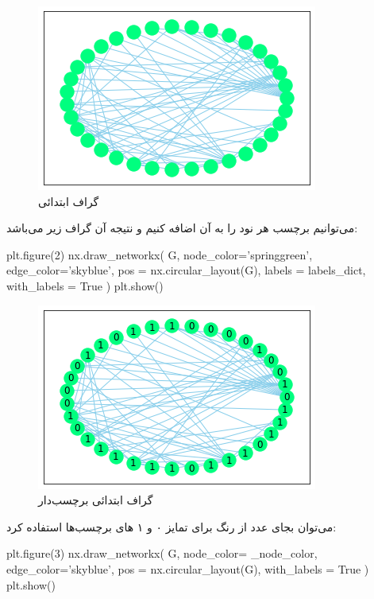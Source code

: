 \documentclass[a4paper, 12pt]{article}
\begin{document}
\begin{figure}[H]
	\begin{center}
		\includegraphics[scale=0.8]{fig1.png}
\end{center}
\caption{گراف ابتدائی}
\end{figure}
می‌توانیم برچسب هر نود را به آن اضافه کنیم و نتیجه آن گراف زیر می‌باشد:
\begin{latin}
	\begin{python}
plt.figure(2)
nx.draw_networkx(
	G,
	node_color='springgreen',
	edge_color='skyblue',
	pos = nx.circular_layout(G),
	labels = labels_dict,
	with_labels = True
)
plt.show()
	\end{python}
\end{latin}
\begin{figure}[H]
	\begin{center}
		\includegraphics[scale=0.8]{fig2.png}
	\end{center}
\caption{گراف ابتدائی برچسب‌دار}
\end{figure}
می‌توان بجای عدد از رنگ برای تمایز ۰ و ۱ های برچسب‌ها استفاده کرد:
\begin{latin}
	\begin{python}
plt.figure(3)
	nx.draw_networkx(
	G,
	node_color= _node_color,
	edge_color='skyblue',
	pos = nx.circular_layout(G),
	with_labels = True
)
plt.show()
	\end{python}
\end{latin}
\end{document}
